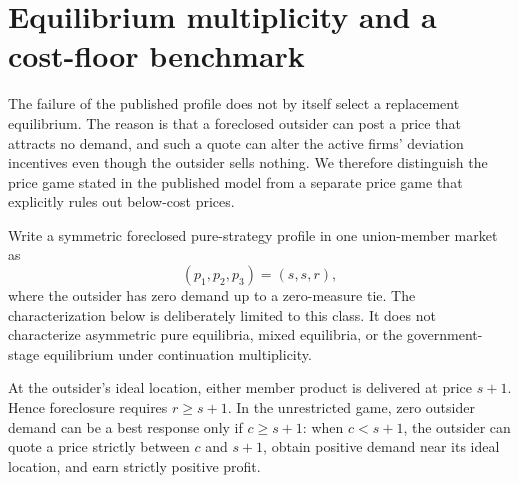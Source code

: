 \section{Equilibrium multiplicity and a cost-floor benchmark}\label{sec:equilibrium}

The failure of the published profile does not by itself select a replacement equilibrium. The reason is that a foreclosed outsider can post a price that attracts no demand, and such a quote can alter the active firms' deviation incentives even though the outsider sells nothing. We therefore distinguish the price game stated in the published model from a separate price game that explicitly rules out below-cost prices.

Write a symmetric foreclosed pure-strategy profile in one union-member market as
\[
 (p_1,p_2,p_3)=(s,s,r),
\]
where the outsider has zero demand up to a zero-measure tie. The characterization below is deliberately limited to this class. It does not characterize asymmetric pure equilibria, mixed equilibria, or the government-stage equilibrium under continuation multiplicity.

At the outsider's ideal location, either member product is delivered at price $s+1$. Hence foreclosure requires $r\geq s+1$. In the unrestricted game, zero outsider demand can be a best response only if $c\geq s+1$: when $c<s+1$, the outsider can quote a price strictly between $c$ and $s+1$, obtain positive demand near its ideal location, and earn strictly positive profit.

